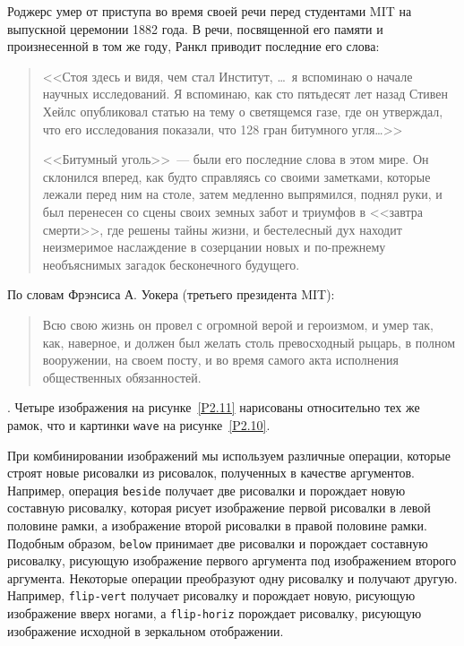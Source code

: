{  Роджерс умер от приступа во время своей речи перед
  студентами MIT на выпускной церемонии 1882 года. В речи, посвященной
  его памяти и произнесенной в том же году, Ранкл приводит последние его слова:

  \begin{quote}
    <<Стоя здесь и видя, чем стал Институт, \ldots\ я
    вспоминаю о начале научных исследований.  Я вспоминаю, как сто
    пятьдесят лет назад Стивен Хейлс опубликовал статью на тему о светящемся 
    газе, где он утверждал, что его исследования показали, что 128 гран
    битумного угля\ldots>>

    <<Битумный уголь>>~--- были его последние слова 
    в этом мире.  Он склонился вперед, как будто справляясь со своими
    заметками, которые лежали перед ним на столе, затем медленно
    выпрямился, поднял руки, и был перенесен со сцены своих земных забот и 
    триумфов в <<завтра смерти>>, где решены тайны жизни, и бестелесный
    дух находит неизмеримое наслаждение в созерцании новых и по-прежнему
    необъяснимых загадок бесконечного будущего.
  \end{quote}

  По словам  Фрэнсиса А. Уокера (третьего президента
  MIT):

  \begin{quote}
    Всю свою жизнь он провел с огромной верой и
    героизмом, и умер так, как, наверное, и должен был желать столь
    превосходный рыцарь, в полном вооружении, на своем посту, и во время
    самого акта исполнения общественных обязанностей.
  \end{quote}}.
Четыре изображения на рисунке~\ref{P2.11} нарисованы относительно тех же
рамок, что и картинки {\tt wave} на рисунке~\ref{P2.10}.

При комбинировании изображений мы используем различные
операции, которые строят новые рисовалки из рисовалок, полученных в
качестве аргументов.  Например, операция {\tt beside}
получает
две рисовалки и порождает новую составную рисовалку, которая рисует
изображение первой рисовалки в левой половине рамки, а изображение
второй рисовалки в правой половине рамки.  Подобным образом,
{\tt below} 
принимает две рисовалки и порождает составную
рисовалку, рисующую изображение первого аргумента под изображением
второго аргумента.  Некоторые операции преобразуют одну рисовалку и
получают другую.  Например, {\tt flip-vert}
получает рисовалку и 
порождает новую, рисующую изображение вверх ногами, а
{\tt flip-horiz}
порождает рисовалку, рисующую изображение
исходной в зеркальном отображении.


